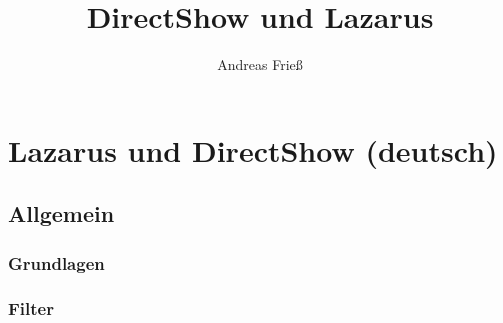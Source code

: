 \documentclass[10pt,
a4paper,
oneside,
titlepage,
bibtotocnumbered,	  %
liststotocnumbered]{scrbook}
\author{Andreas Frieß}
\title{DirectShow und Lazarus}
\begin{document}
\setcounter{tocdepth}{3} %
\pagestyle{empty} %
\maketitle 						%
%	
\tableofcontents			%

\newpage
\pagestyle{headings} %

\part[Lazarus und DirectShow]{Lazarus und DirectShow (deutsch)}
\chapter{Allgemein}
\section{Grundlagen}


\section{Filter}



\listoffigures
\listoftables

\printnoidxglossaries
\end{document}
